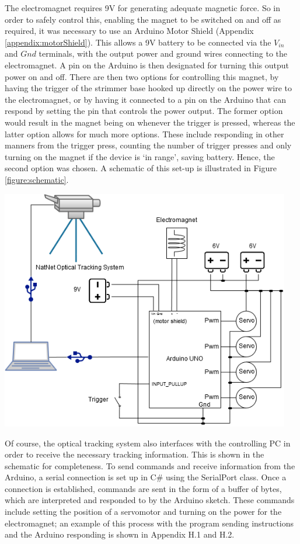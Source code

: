 \documentclass[11pt]{article}
\begin{document}
The electromagnet requires 9V for generating adequate magnetic force. So in order to safely control this, enabling the magnet to be switched on and off as required, it was necessary to use an Arduino Motor Shield (Appendix \ref{appendix:motorShield}). This allows a 9V battery to be connected via the $V_{in}$ and $Gnd$ terminals, with the output power and ground wires connecting to the electromagnet. A pin on the Arduino is then designated for turning this output power on and off. There are then two options for controlling this magnet, by having the trigger of the strimmer base hooked up directly on the power wire to the electromagnet, or by having it connected to a pin on the Arduino that can respond by setting the pin that controls the power output. The former option would result in the magnet being on whenever the trigger is pressed, whereas the latter option allows for much more options. These include responding in other manners from the trigger press, counting the number of trigger presses and only turning on the magnet if the device is `in range', saving battery. Hence, the second option was chosen. A schematic of this set-up is illustrated in Figure \ref{figure:schematic}.


\begin{center}
\includegraphics[width=0.95\textwidth]{images/newSchematic.png}
\label{figure:schematic}
\end{center}

Of course, the optical tracking system also interfaces with the controlling PC in order to receive the necessary tracking information. This is shown in the schematic for completeness. To send commands and receive information from the Arduino, a serial connection is set up in C\# using the SerialPort class. Once a connection is established, commands are sent in the form of a buffer of bytes, which are interpreted and responded to by the Arduino sketch. These commands include setting the position of a servomotor and turning on the power for the electromagnet; an example of this process with the program sending instructions and the Arduino responding is shown in Appendix H.1 and H.2.
\end{document}
